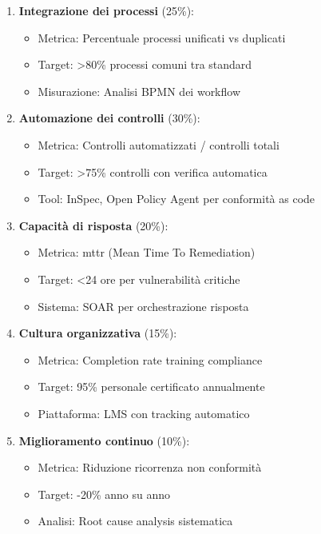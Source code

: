 \begin{enumerate}
    \item \textbf{Integrazione dei processi} (25\%): 
    \begin{itemize}
        \item Metrica: Percentuale processi unificati vs duplicati
        \item Target: >80\% processi comuni tra standard
        \item Misurazione: Analisi BPMN dei workflow
    \end{itemize}
    
    \item \textbf{Automazione dei controlli} (30\%):
    \begin{itemize}
        \item Metrica: Controlli automatizzati / controlli totali
        \item Target: >75\% controlli con verifica automatica
        \item Tool: InSpec, Open Policy Agent per conformità as code
    \end{itemize}
    
    \item \textbf{Capacità di risposta} (20\%):
    \begin{itemize}
        \item Metrica: \gls{mttr} (Mean Time To Remediation)
        \item Target: <24 ore per vulnerabilità critiche
        \item Sistema: SOAR per orchestrazione risposta
    \end{itemize}
    
    \item \textbf{Cultura organizzativa} (15\%):
    \begin{itemize}
        \item Metrica: Completion rate training compliance
        \item Target: 95\% personale certificato annualmente
        \item Piattaforma: LMS con tracking automatico
    \end{itemize}
    
    \item \textbf{Miglioramento continuo} (10\%):
    \begin{itemize}
        \item Metrica: Riduzione ricorrenza non conformità
        \item Target: -20\% anno su anno
        \item Analisi: Root cause analysis sistematica
    \end{itemize}
\end{enumerate}

